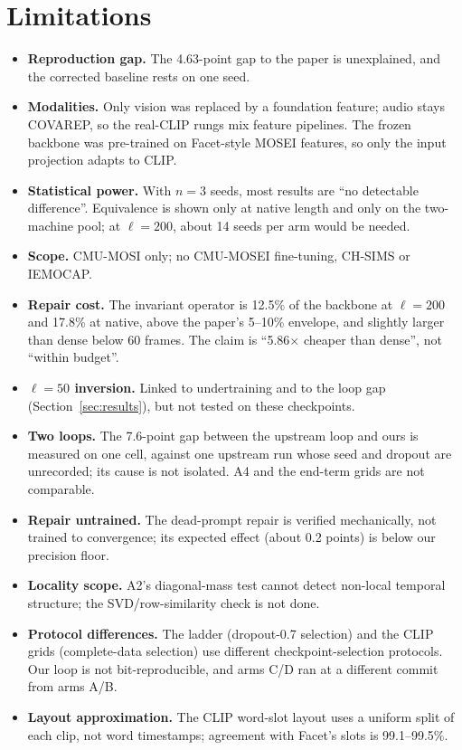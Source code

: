 \documentclass[lettersize,journal]{IEEEtran}
\begin{document}
\section{Limitations}
\begin{itemize}
\item \textbf{Reproduction gap.} The 4.63-point gap to the paper is unexplained, and the corrected baseline rests on one seed.
\item \textbf{Modalities.} Only vision was replaced by a foundation feature; audio stays COVAREP, so the real-CLIP rungs mix feature pipelines. The frozen backbone was pre-trained on Facet-style MOSEI features, so only the input projection adapts to CLIP.
\item \textbf{Statistical power.} With $n=3$ seeds, most results are ``no detectable difference''. Equivalence is shown only at native length and only on the two-machine pool; at $\ell=200$, about 14 seeds per arm would be needed.
\item \textbf{Scope.} CMU-MOSI only; no CMU-MOSEI fine-tuning, CH-SIMS or IEMOCAP.
\item \textbf{Repair cost.} The invariant operator is 12.5\% of the backbone at $\ell=200$ and 17.8\% at native, above the paper's 5--10\% envelope, and slightly larger than dense below 60 frames. The claim is ``5.86$\times$ cheaper than dense'', not ``within budget''.
\item \textbf{$\ell=50$ inversion.} Linked to undertraining and to the loop gap (Section~\ref{sec:results}), but not tested on these checkpoints.
\item \textbf{Two loops.} The 7.6-point gap between the upstream loop and ours is measured on one cell, against one upstream run whose seed and dropout are unrecorded; its cause is not isolated. A4 and the end-term grids are not comparable.
\item \textbf{Repair untrained.} The dead-prompt repair is verified mechanically, not trained to convergence; its expected effect (about 0.2 points) is below our precision floor.
\item \textbf{Locality scope.} A2's diagonal-mass test cannot detect non-local temporal structure; the SVD/row-similarity check is not done.
\item \textbf{Protocol differences.} The ladder (dropout-0.7 selection) and the CLIP grids (complete-data selection) use different checkpoint-selection protocols. Our loop is not bit-reproducible, and arms C/D ran at a different commit from arms A/B.
\item \textbf{Layout approximation.} The CLIP word-slot layout uses a uniform split of each clip, not word timestamps; agreement with Facet's slots is 99.1--99.5\%.
\end{itemize}
\end{document}
